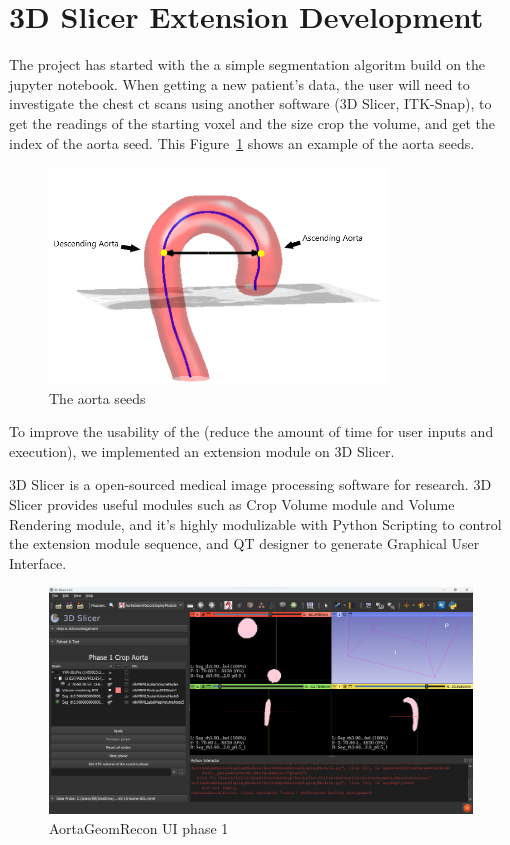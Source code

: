 \section{3D Slicer Extension Development}
The project has started with the a simple segmentation algoritm build on the jupyter notebook. When getting a new patient's data, the user will need to investigate the chest ct scans using another software (3D Slicer, ITK-Snap), to get the readings of the starting voxel and the size crop the volume, and get the index of the aorta seed. This Figure~\ref{fig_aorta_seed} shows an example of the aorta seeds.

\begin{figure}[ht]
    \centering
    \includegraphics[width=0.8\textwidth]{figures/Sample/Aorta_seeds.png}
    \caption[The Aorta Seeds]{The aorta seeds \citep{6346433}}
    \label{fig_aorta_seed}
\end{figure}

To improve the usability of the \progname{} (reduce the amount of time for user inputs and execution), we implemented an extension module on 3D Slicer. 

3D Slicer is a open-sourced medical image processing software for research. 3D Slicer provides useful modules such as Crop Volume module and Volume Rendering module, and it's highly modulizable with Python Scripting to control the extension module sequence, and QT designer to generate Graphical User Interface.

\begin{figure}[ht]
    \centering
    \includegraphics[width=\textwidth]{figures/Sample/SlicerUI.png}
    \caption[AortaGeomRecon phase 1 User Interface]{AortaGeomRecon UI phase 1}
    \label{fig_UI_1}
\end{figure}

